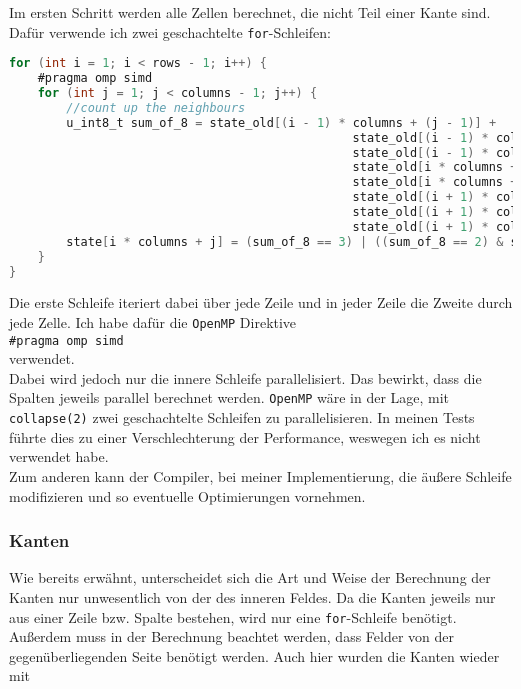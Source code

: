 \documentclass[german,plainarticle,hyperref,utf8]{zihpub}
\begin{document}
	Im ersten Schritt werden alle Zellen berechnet, die nicht Teil einer Kante sind. Dafür verwende ich zwei geschachtelte \texttt{for}-Schleifen:\\
	\begin{lstlisting}[language=C, caption=Berechnung der inneren Zellen]
for (int i = 1; i < rows - 1; i++) {
	#pragma omp simd
	for (int j = 1; j < columns - 1; j++) {
		//count up the neighbours
		u_int8_t sum_of_8 = state_old[(i - 1) * columns + (j - 1)] +
												state_old[(i - 1) * columns + j] +
												state_old[(i - 1) * columns + (j + 1)] +
												state_old[i * columns + (j - 1)] +
												state_old[i * columns + (j + 1)] +
												state_old[(i + 1) * columns + (j - 1)] +
												state_old[(i + 1) * columns + j] +
												state_old[(i + 1) * columns + (j + 1)];
		state[i * columns + j] = (sum_of_8 == 3) | ((sum_of_8 == 2) & state_old[i * columns + j]);
	}
}\end{lstlisting}
	
	Die erste Schleife iteriert dabei über jede Zeile und in jeder Zeile die Zweite durch jede Zelle. Ich habe dafür die \texttt{OpenMP} Direktive\\
	
	\texttt{\#pragma omp simd}\\
	
	verwendet.\\
	Dabei wird jedoch nur die innere Schleife parallelisiert. Das bewirkt, dass die Spalten jeweils parallel berechnet werden. \texttt{OpenMP} wäre in der Lage, mit \texttt{collapse(2)} zwei geschachtelte Schleifen zu parallelisieren. In meinen Tests führte dies zu einer Verschlechterung der Performance, weswegen ich es nicht verwendet habe.\\
	Zum anderen kann der Compiler, bei meiner Implementierung, die äußere Schleife modifizieren und so eventuelle Optimierungen vornehmen.
	
	\subsubsection{Kanten}
	
	Wie bereits erwähnt, unterscheidet sich die Art und Weise der Berechnung der Kanten nur unwesentlich von der des inneren Feldes. Da die Kanten jeweils nur aus einer Zeile bzw. Spalte bestehen, wird nur eine \texttt{for}-Schleife benötigt. Außerdem muss in der Berechnung beachtet werden, dass Felder von der gegenüberliegenden Seite benötigt werden.
	Auch hier wurden die Kanten wieder mit\\
	
\end{document}
